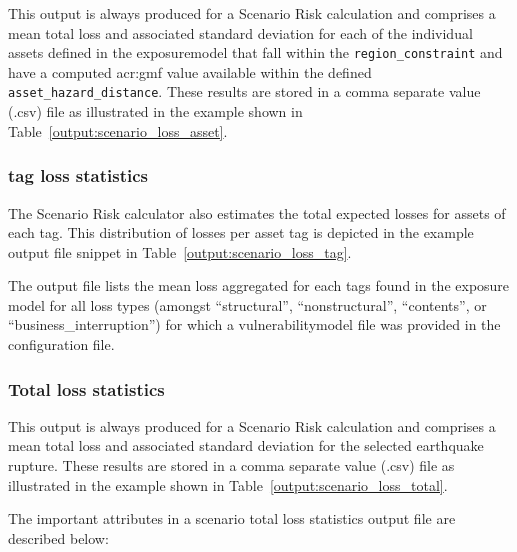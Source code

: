 This output is always produced for a Scenario Risk calculation and comprises a
mean total loss and associated standard deviation for each of the individual
\glspl{asset} defined in the \gls{exposuremodel} that fall within the
\Verb+region_constraint+ and have a computed \gls{acr:gmf} value available
within the defined \Verb+asset_hazard_distance+. These results are stored in a
comma separate value (.csv) file as illustrated in the example shown in
Table~\ref{output:scenario_loss_asset}.




\subsubsection{tag loss statistics}
\label{subsubsec:scenario_tag_loss_statistics}

The Scenario Risk calculator also estimates the total expected losses for
assets of each \gls{tag}. This distribution of losses per asset
\gls{tag} is depicted in the example output file snippet in
Table~\ref{output:scenario_loss_tag}.



The output file lists the mean loss aggregated for each \glspl{tag}
found in the exposure model for all loss types (amongst ``structural'',
``nonstructural'', ``contents'', or ``business\_interruption'') for which a
\gls{vulnerabilitymodel} file was provided in the configuration file.


\subsubsection{Total loss statistics}
\label{subsubsec:scenario_total_loss_statistics}

This output is always produced for a Scenario Risk calculation and comprises a
mean total loss and associated standard deviation for the selected earthquake
rupture. These results are stored in a comma separate value (.csv) file as
illustrated in the example shown in Table~\ref{output:scenario_loss_total}.



The important attributes in a scenario total loss statistics output file are
described below:


